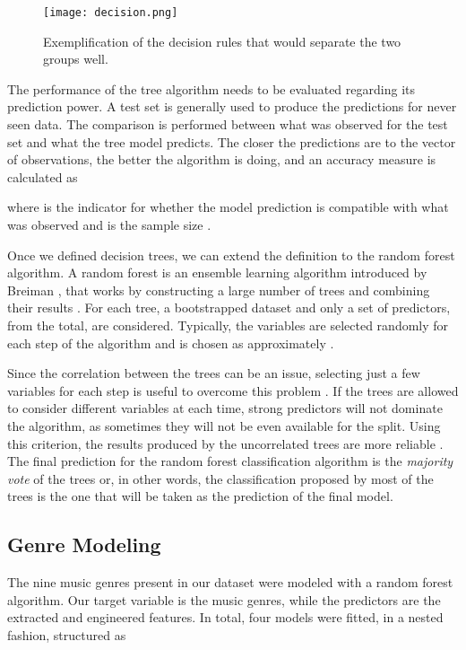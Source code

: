 \documentclass[twocolumn]{article}
\begin{document}
\begin{figure}[t]
\centering
\texttt{[image: decision.png]}
\caption{Exemplification of the decision rules that would separate the two groups well.}
\label{fig:decision}
\end{figure}

The performance of the tree algorithm needs to be evaluated regarding its prediction power. A test set is generally 
used to produce the predictions for never seen data. 
The comparison is performed between what was observed 
for the test set and what the tree model predicts. 
The closer the predictions are to the vector of observations,
the better the algorithm is doing, and an accuracy measure is calculated as 


where  is the indicator for whether the model
prediction  is compatible with 
what was observed and  is the sample size 
\cite{Hastie}.

Once we defined decision trees, we can extend the definition to the random forest algorithm. 
A random forest is an ensemble learning algorithm
introduced by Breiman \cite{Breiman2001}, 
that works by constructing a large number  
of trees and combining their results \cite{Hastie}. 
For each tree, a bootstrapped dataset 
\cite{Efron1979} and only a set of 
 predictors, from the  total, are considered. 
Typically, the variables are selected randomly for
each step of the algorithm and  is chosen as 
approximately  \cite{Hastie}.   

Since the correlation between the trees can be an issue,
selecting just a few variables for each step is useful to
overcome this problem \cite{Bernard2010}.
If the trees are allowed to consider different variables at
each time, strong predictors will not dominate the algorithm,
as sometimes they will not be even available
for the split. Using this criterion, 
the results produced by the uncorrelated trees are more reliable \cite{Hastie}. 
The final prediction for the random forest 
classification algorithm 
is the \textit{majority vote} of the  trees or, 
in other words, the classification proposed
by most of the trees is the one that will be
taken as the prediction of the final model. 


\subsection{Genre Modeling}

The nine music genres present in our dataset 
were modeled with a random forest algorithm. Our target
variable is the music genres, while the predictors are 
the extracted and engineered features. In total, 
four models were fitted, in a nested fashion, structured
as
\end{document}
